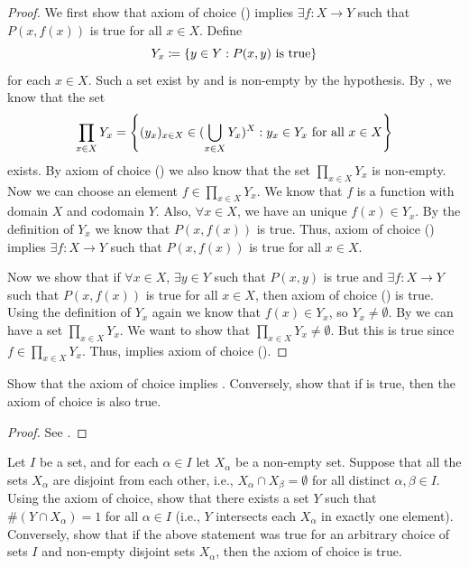 \begin{proof}
  We first show that axiom of choice () implies \(\exists f : X \to Y\) such that \(P(x, f(x))\) is true for all \(x \in X\).
  Define
  \[
    Y_x \coloneqq \left\lbrace y \in Y : P(x, y) \text{ is true}\right\rbrace
  \]
  for each \(x \in X\).
  Such a set exist by  and is non-empty by the hypothesis.
  By , we know that the set
  \[
    \prod_{x \in X} Y_x = \left\lbrace(y_x)_{x \in X} \in (\bigcup_{x \in X} Y_x)^X : y_x \in Y_x \text{ for all } x \in X\right\rbrace
  \]
  exists.
  By axiom of choice () we also know that the set \(\prod_{x \in X} Y_x\) is non-empty.
  Now we can choose an element \(f \in \prod_{x \in X} Y_x\).
  We know that \(f\) is a function with domain \(X\) and codomain \(Y\).
  Also, \(\forall x \in X\), we have an unique \(f(x) \in Y_x\).
  By the definition of \(Y_x\) we know that \(P(x, f(x))\) is true.
  Thus, axiom of choice () implies \(\exists f : X \to Y\) such that \(P(x, f(x))\) is true for all \(x \in X\).

  Now we show that if \(\forall x \in X\), \(\exists y \in Y\) such that \(P(x, y)\) is true and \(\exists f : X \to Y\) such that \(P(x, f(x))\) is true for all \(x \in X\), then axiom of choice () is true.
  Using the definition of \(Y_x\) again we know that \(f(x) \in Y_x\), so \(Y_x \neq \emptyset\).
  By  we can have a set \(\prod_{x \in X} Y_x\).
  We want to show that \(\prod_{x \in X} Y_x \neq \emptyset\).
  But this is true since \(f \in \prod_{x \in X} Y_x\).
  Thus,  implies axiom of choice ().
\end{proof}

\exercisesection

\begin{ex}\label{i:ex:8.4.1}
  Show that the axiom of choice implies .
  Conversely, show that if  is true, then the axiom of choice is also true.
\end{ex}

\begin{proof}
  See .
\end{proof}

\begin{ex}\label{i:ex:8.4.2}
  Let \(I\) be a set, and for each \(\alpha \in I\) let \(X_{\alpha}\) be a non-empty set.
  Suppose that all the sets \(X_{\alpha}\) are disjoint from each other, i.e., \(X_{\alpha} \cap X_{\beta} = \emptyset\) for all distinct \(\alpha, \beta \in I\).
  Using the axiom of choice, show that there exists a set \(Y\) such that \(\#(Y \cap X_{\alpha}) = 1\) for all \(\alpha \in I\) (i.e., \(Y\) intersects each \(X_{\alpha}\) in exactly one element).
  Conversely, show that if the above statement was true for an arbitrary choice of sets \(I\) and non-empty disjoint sets \(X_{\alpha}\), then the axiom of choice is true.
\end{ex}

